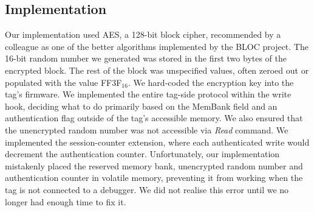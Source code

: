 \documentclass[journal]{IEEEtran}
\begin{document}
    \subsection{Implementation}
        Our implementation used AES, a 128-bit block cipher, recommended by a colleague as one of the better algorithms implemented by the BLOC project.\cite{bloc,altbloc}
        The 16-bit random number we generated was stored in the first two bytes of the encrypted block.
        The rest of the block was unspecified values, often zeroed out or populated with the value FF3F$_{16}$.
        We hard-coded the encryption key into the tag's firmware.
        We implemented the entire tag-side protocol within the write hook, deciding what to do primarily based on the MemBank field and an authentication flag outside of the tag's accessible memory.
        We also ensured that the unencrypted random number was not accessible via \textit{Read} command.
        We implemented the session-counter extension, where each authenticated write would decrement the authentication counter.
        Unfortunately, our implementation mistakenly placed the reserved memory bank, unencrypted random number and authentication counter in volatile memory, preventing it from working when the tag is not connected to a debugger.
        We did not realise this error until we no longer had enough time to fix it.
\end{document}
